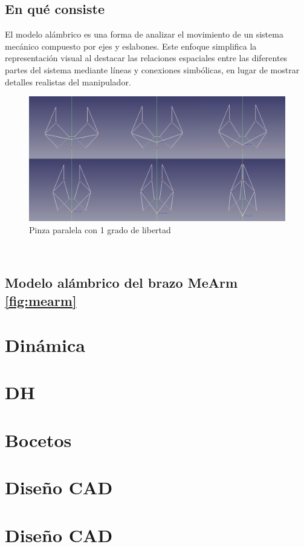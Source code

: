 \subsection{En qué consiste}
\label{subsec:eqc_mod_alambrico}
El modelo alámbrico es una forma de analizar el movimiento de un sistema mecánico compuesto por ejes y eslabones. Este 
enfoque simplifica la representación visual al destacar las relaciones espaciales entre las diferentes partes del sistema mediante 
líneas y conexiones simbólicas, en lugar de mostrar detalles realistas del manipulador. 
\begin{figure} [h!]
  \begin{center}
    \includegraphics[width=15cm]{figs/pinza_evol.png}
  \end{center}
  \caption{Pinza paralela con 1 grado de libertad}
  \label{fig:mod_pinza_figure}
\end{figure}\ 

\subsection{Modelo alámbrico del brazo MeArm \ref{fig:mearm}}
\label{subsec:mod_mearm}


\section{Dinámica}

\section{DH}

\section{Bocetos}

\section{Diseño CAD}

\section{Diseño CAD}
